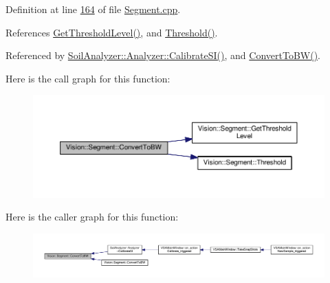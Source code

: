 Definition at line \hyperlink{_segment_8cpp_source_l00164}{164} of file \hyperlink{_segment_8cpp_source}{Segment.\+cpp}.



References \hyperlink{_segment_8cpp_source_l00069}{Get\+Threshold\+Level()}, and \hyperlink{_segment_8cpp_source_l00176}{Threshold()}.



Referenced by \hyperlink{analyzer_8cpp_source_l00388}{Soil\+Analyzer\+::\+Analyzer\+::\+Calibrate\+S\+I()}, and \hyperlink{_segment_8cpp_source_l00153}{Convert\+To\+B\+W()}.



Here is the call graph for this function\+:
\nopagebreak
\begin{figure}[H]
\begin{center}
\leavevmode
\includegraphics[width=350pt]{class_vision_1_1_segment_a4272ceb22f9cb20c6f65d9536149d3c0_cgraph}
\end{center}
\end{figure}




Here is the caller graph for this function\+:
\nopagebreak
\begin{figure}[H]
\begin{center}
\leavevmode
\includegraphics[width=350pt]{class_vision_1_1_segment_a4272ceb22f9cb20c6f65d9536149d3c0_icgraph}
\end{center}
\end{figure}


\hypertarget{class_vision_1_1_segment_a513af00e29683fa172ce1844ffd7f98f}{}

